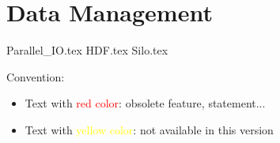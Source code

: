 \documentclass[11pt]{book}
\begin{document}


% 
% 
% 
% 
% 
% 
% 
% 
% 
% 

% 
% 

% 
% 
% 
% 
% 
% 
% 
% 
\part{Data Management}

{Parallel_IO.tex}
{HDF.tex}
{Silo.tex}
%

%
% 
% 
% 
% 
% 
% 
% 
% 
% 
% 
% 
% 
% 
% 
%  
 
% 



%
Convention:

\begin{itemize}
\item Text with \textcolor{red}{red color}: obsolete feature,
  statement...
\item Text with \textcolor{yellow}{yellow color}: not available in this
  version
\end{itemize}
\backmatter 
%
%
 
\printindex %
\end{document}
